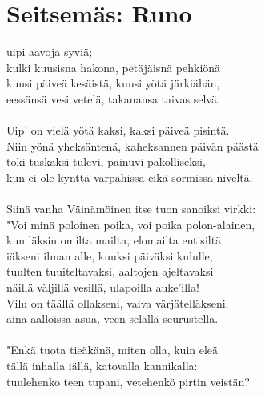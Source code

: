 
\chapter*{Seitsemäs: Runo}

 uipi aavoja syviä;      \\
kulki kuusisna hakona, petäjäisnä pehkiönä                \\
kuusi päiveä kesäistä, kuusi yötä järkiähän,              \\
eessänsä vesi vetelä, takanansa taivas selvä.             \\
                                                          \\
Uip' on vielä yötä kaksi, kaksi päiveä pisintä.           \\
Niin yönä yheksäntenä, kaheksannen päivän päästä          \\
toki tuskaksi tulevi, painuvi pakolliseksi,               \\
kun ei ole kynttä varpahissa eikä sormissa niveltä.       \\
                                                          \\
Siinä vanha Väinämöinen itse tuon sanoiksi virkki:        \\
"Voi minä poloinen poika, voi poika polon-alainen,        \\
kun läksin omilta mailta, elomailta entisiltä             \\
iäkseni ilman alle, kuuksi päiväksi kululle,              \\
tuulten tuuiteltavaksi, aaltojen ajeltavaksi              \\
näillä väljillä vesillä, ulapoilla auke'illa!             \\
Vilu on täällä ollakseni, vaiva värjätelläkseni,          \\
aina aalloissa asua, veen selällä seurustella.            \\
                                                          \\
"Enkä tuota tieäkänä, miten olla, kuin eleä               \\
tällä inhalla iällä, katovalla kannikalla:                \\
tuulehenko teen tupani, vetehenkö pirtin veistän?         \\
                                                          \\
